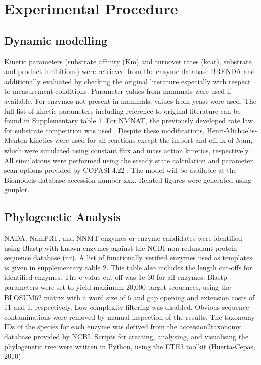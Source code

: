 
\section{Experimental Procedure}

\subsection{Dynamic modelling}

Kinetic parameters (substrate affinity (Km) and turnover rates (kcat), substrate and product inhibitions) were retrieved from the enzyme database BRENDA and additionally evaluated by checking the original literature especially with respect to measurement conditions. Parameter values from mammals were used if available. For enzymes not present in mammals, values from yeast were used. The full list of kinetic parameters including reference to original literature can be found in Supplementary table 1. For NMNAT, the previously developed rate law for substrate competition was used \cite{Schauble2013}. Despite these modifications, Henri-Michaelis-Menten kinetics were used for all reactions except the import and efflux of Nam, which were simulated using constant flux and mass action kinetics, respectively. All simulations were performed using the steady state calculation and parameter scan options provided by COPASI 4.22 \cite{Hoops2006}. The model will be available at the Biomodels database accession number xxx. Related figures were generated using gnuplot.


\subsection{Phylogenetic Analysis}

NADA, NamPRT, and NNMT enzymes or enzyme candidates were identified using Blastp with known enzymes against the NCBI non-redundant protein sequence database (nr). A list of functionally verified enzymes used as templates is given in supplementary table 2. This table also includes the length cut-offs for identified enzymes. The e-value cut-off was 1e-30 for all enzymes. Blastp parameters were set to yield maximum 20,000 target sequences, using the BLOSUM62 matrix with a word size of 6 and gap opening and extension costs of 11 and 1, respectively. Low-complexity filtering was disabled. Obvious sequence contaminations were removed by manual inspection of the results. The taxonomy IDs of the species for each enzyme was derived from the accession2taxonomy database provided by NCBI. Scripts for creating, analysing, and visualising the phylogenetic tree were written in Python, using the ETE3 toolkit (Huerta-Cepas, 2010).


